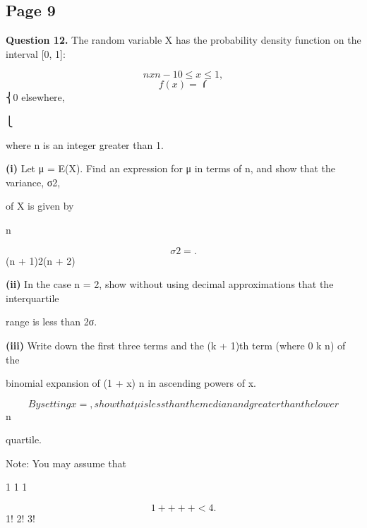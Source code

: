 \documentclass[12pt]{article}
\begin{document}
\subsection*{Page 9}
\begin{flushleft}
\bigskip\textbf{Question 12.} The random variable X has the probability density function on the interval [0, 1]:\par
\[nxn-1 0 \leq x \leq 1,\]
\[f(x) = ⎧\]
⎨0 elsewhere,\par
⎩\par
where n is an integer greater than 1.\par
\textbf{(i)} Let μ = E(X). Find an expression for μ in terms of n, and show that the variance, σ2,\par
of X is given by\par
n\par
\[σ2 = .\]
(n + 1)2(n + 2)\par
\textbf{(ii)} In the case n = 2, show without using decimal approximations that the interquartile\par
range is less than 2σ.\par
\textbf{(iii)} Write down the first three terms and the (k + 1)th term (where 0 \leq k \leq n) of the\par
binomial expansion of (1 + x) n in ascending powers of x.\par
\[By setting x = , show that μ is less than the median and greater than the lower\]
n\par
quartile.\par
Note: You may assume that\par
1 1 1\par
\[1 + + + + < 4.\]
1! 2! 3! \cdots\par
\end{flushleft}
\end{document}
